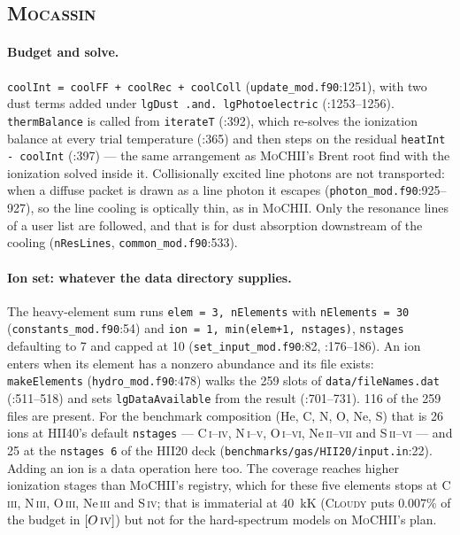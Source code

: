 \documentclass[english,a4paper]{my_memo}
\newcommand{\code}[1]{\texttt{#1}}
\newcommand{\MoCHII}{\textsc{MoCHII}}
\newcommand{\Cloudy}{\textsc{Cloudy}}
\newcommand{\Mocassin}{\textsc{Mocassin}}
\newcommand{\OIII}{O\,\textsc{iii}}
\newcommand{\NIII}{N\,\textsc{iii}}
\newcommand{\CIII}{C\,\textsc{iii}}
\newcommand{\SIV}{S\,\textsc{iv}}
\newcommand{\NeIII}{Ne\,\textsc{iii}}
\newcommand{\OIV}{O\,\textsc{iv}}
\begin{document}
\subsection{\Mocassin{}}

\paragraph{Budget and solve.}  \code{coolInt = coolFF + coolRec + coolColl}
(\code{update\_mod.f90}:1251), with two dust terms added under
\code{lgDust .and. lgPhotoelectric} (:1253--1256).  \code{thermBalance} is
called from \code{iterateT} (:392), which re-solves the ionization balance at
every trial temperature (:365) and then steps on the residual
\code{heatInt - coolInt} (:397) --- the same arrangement as \MoCHII{}'s
Brent root find with the ionization solved inside it.  Collisionally excited line
photons are not transported: when a diffuse packet is drawn as a line photon it
escapes (\code{photon\_mod.f90}:925--927), so the line cooling is optically
thin, as in \MoCHII{}.  Only the resonance lines of a user list are followed,
and that is for dust absorption downstream of the cooling (\code{nResLines},
\code{common\_mod.f90}:533).

\paragraph{Ion set: whatever the data directory supplies.}  The heavy-element
sum runs \code{elem = 3, nElements} with \code{nElements = 30}
(\code{constants\_mod.f90}:54) and \code{ion = 1, min(elem+1, nstages)},
\code{nstages} defaulting to 7 and capped at 10
(\code{set\_input\_mod.f90}:82, :176--186).  An ion enters when its element has
a nonzero abundance and its file exists: \code{makeElements}
(\code{hydro\_mod.f90}:478) walks the 259 slots of \code{data/fileNames.dat}
(:511--518) and sets \code{lgDataAvailable} from the result (:701--731).  116
of the 259 files are present.  For the benchmark composition (He, C, N, O, Ne,
S) that is 26 ions at HII40's default \code{nstages} ---
C\,\textsc{i}--\textsc{iv}, N\,\textsc{i}--\textsc{v},
O\,\textsc{i}--\textsc{vi}, Ne\,\textsc{ii}--\textsc{vii} and
S\,\textsc{ii}--\textsc{vi} --- and 25 at the \code{nstages 6} of the HII20
deck (\code{benchmarks/gas/HII20/input.in}:22).  Adding an ion is a data
operation here too.  The coverage reaches higher ionization stages than
\MoCHII{}'s registry, which for these five elements stops at \CIII{}, \NIII{},
\OIII{}, \NeIII{} and \SIV{}; that is immaterial at 40~kK (\Cloudy{} puts
$0.007\%$ of the budget in $[\OIV{}]$) but not for the hard-spectrum models on
\MoCHII{}'s plan.
\end{document}
